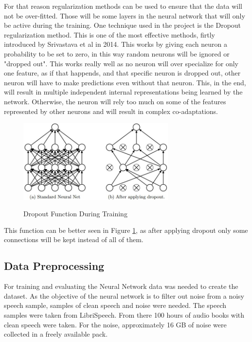 For that reason regularization methods can be used to ensure that the data will not be over-fitted. Those will be some layers in the neural network that will only be active during the training.
One technique used in the project is the Dropout regularization method. This is one of the most effective methods, firtly introduced by Srivastava et al in 2014.\cite{DROPOUT} This works by giving each neuron a probability to be set to zero, in this way random neurons will be ignored or "dropped out". This works really well as no neuron will over specialize for only one feature, as if that happends, and that specific neuron is dropped out, other neuron will have to make predictions even without that neuron. This, in the end, will result in multiple independent internal representations being learned by the network. Otherwise, the neuron will rely too much on some of the features represented by other neurons and will result in complex co-adaptations.


\begin{figure}[htp]
	\centering
	\includegraphics[width=0.7\textwidth]{Illustrations/dropout.jpeg}
	\caption{Dropout Function During Training}\cite{DROPOUT}
	\label{fig:dropout}
\end{figure}

This function can be better seen in Figure \ref{fig:dropout}, as after applying dropout only some connections will be kept instead of all of them.
\newpage
\subsection{Data Preprocessing}

For training and evaluating the Neural Network data was needed to create the dataset. As the objective of the neural network is to filter out noise from a noisy speech sample, samples of clean speech and noise were needed. The speech samples were taken from LibriSpeech.\cite{SPEECH} From there 100 hours of audio books with clean speech were taken.
For the noise, approximately 16 GB of noise were collected in a freely available pack.\cite{NOISE}

